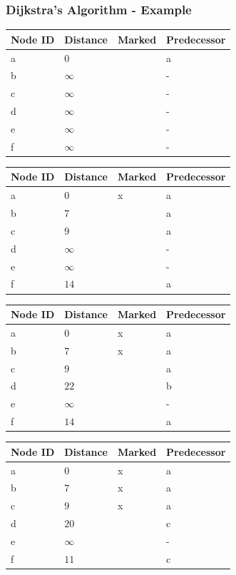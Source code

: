 \begin{frame}[fragile]
\frametitle{Dijkstra's Algorithm - Example}
{\tiny
\begin{tabular}{l|l|l|l}
Node ID & Distance & Marked & Predecessor\\
\hline
a & $0$ & & a\\
b & $\infty$ & & -\\
c & $\infty$ & & -\\
d & $\infty$ & & -\\
e & $\infty$ & & -\\
f & $\infty$ & & -\\
\end{tabular}
\begin{tabular}{l|l|l|l}
Node ID & Distance & Marked & Predecessor\\
\hline
a & $0$ & x & a\\
b & $7$ & & a\\
c & $9$ & & a\\
d & $\infty$ & & -\\
e & $\infty$ & & -\\
f & $14$ & & a\\
\end{tabular}
\newline
\vspace{4mm}
\begin{tabular}{l|l|l|l}
Node ID & Distance & Marked & Predecessor\\
\hline
a & $0$ & x & a\\
b & $7$ & x & a\\
c & $9$ & & a\\
d & $22$ & & b\\
e & $\infty$ & & -\\
f & $14$ & & a\\
\end{tabular}
\begin{tabular}{l|l|l|l}
Node ID & Distance & Marked & Predecessor\\
\hline
a & $0$ & x & a\\
b & $7$ & x & a\\
c & $9$ & x & a\\
d & $20$ & & c\\
e & $\infty$ & & -\\
f & $11$ & & c\\
\end{tabular}
\newline
\vspace{4mm}
\begin{tabular}{l|l|l|l}

\end{tabular}}
\end{frame}
